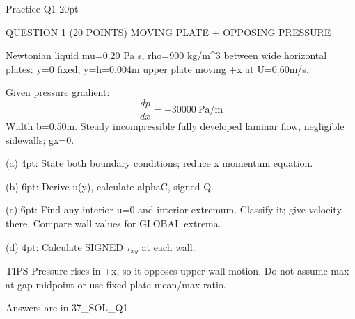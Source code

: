 Practice Q1 20pt

QUESTION 1 (20 POINTS)
MOVING PLATE + OPPOSING PRESSURE

Newtonian liquid mu=0.20 Pa s, rho=900 kg/m^3 between wide horizontal plates:
y=0 fixed, y=h=0.004m upper plate moving +x at U=0.60m/s.

Given pressure gradient:
$$\frac{dp}{dx}=+30000\ \text{Pa/m}$$
Width b=0.50m. Steady incompressible fully developed laminar flow, negligible sidewalls; gx=0.

(a) 4pt: State both boundary conditions; reduce x momentum equation.

(b) 6pt: Derive u(y), calculate alphaC, signed Q.

(c) 6pt: Find any interior u=0 and interior extremum. Classify it; give velocity there. Compare wall values for GLOBAL extrema.

(d) 4pt: Calculate SIGNED $\tau_{xy}$ at each wall.

TIPS
Pressure rises in +x, so it opposes upper-wall motion. Do not assume max at gap midpoint or use fixed-plate mean/max ratio.

Answers are in 37_SOL_Q1.
